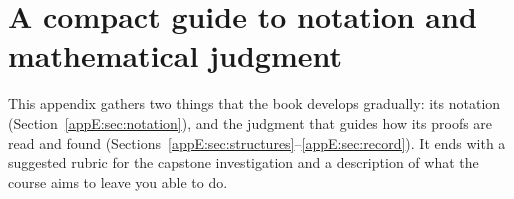 \chapter{A compact guide to notation and mathematical judgment}\label{app:guide}
This appendix gathers two things that the book develops gradually: its notation (Section~\ref{appE:sec:notation}), and the judgment that guides how its proofs are read and found (Sections~\ref{appE:sec:structures}--\ref{appE:sec:record}). It ends with a suggested rubric for the capstone investigation and a description of what the course aims to leave you able to do.







